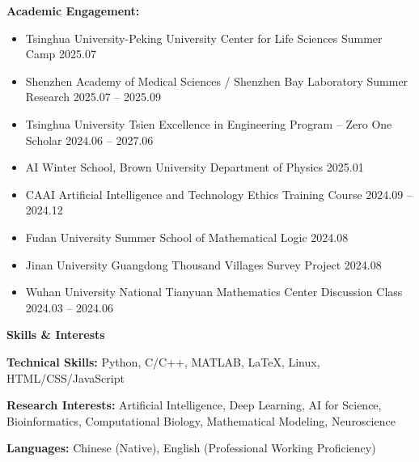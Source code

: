 \documentclass[11pt]{article}
\begin{document}
	\textbf{Academic Engagement:}
	\begin{itemize}[noitemsep, topsep=0pt, partopsep=0pt, parsep=0pt, leftmargin=*]
		\item Tsinghua University-Peking University Center for Life Sciences Summer Camp \hfill 2025.07
		\item Shenzhen Academy of Medical Sciences / Shenzhen Bay Laboratory Summer Research \hfill 2025.07 -- 2025.09
		\item Tsinghua University Tsien Excellence in Engineering Program -- Zero One Scholar \hfill 2024.06 -- 2027.06
		\item AI Winter School, Brown University Department of Physics \hfill 2025.01
		\item CAAI Artificial Intelligence and Technology Ethics Training Course \hfill 2024.09 -- 2024.12
		\item Fudan University Summer School of Mathematical Logic \hfill 2024.08
		\item Jinan University Guangdong Thousand Villages Survey Project \hfill 2024.08
		\item Wuhan University National Tianyuan Mathematics Center Discussion Class \hfill 2024.03 -- 2024.06
	\end{itemize}
	
	\vspace{12pt}
	
	\begin{center}
		\textbf{\large Skills \& Interests}
	\end{center}
	\textbf{Technical Skills:} Python, C/C++, MATLAB, LaTeX, Linux, HTML/CSS/JavaScript
	
	\textbf{Research Interests:} Artificial Intelligence, Deep Learning, AI for Science, Bioinformatics, Computational Biology, Mathematical Modeling, Neuroscience
	
	\textbf{Languages:} Chinese (Native), English (Professional Working Proficiency)
	
\end{document}
